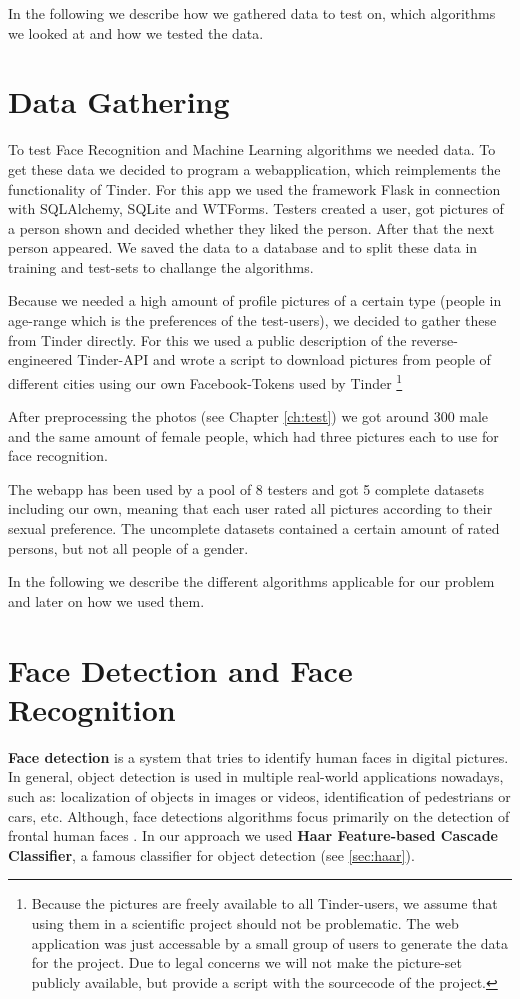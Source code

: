 \documentclass{report}
\begin{document}
In the following we describe how we gathered data to test on, which algorithms we looked at and how we tested the data.

\chapter{Data Gathering}
\label{ch:datagathering}
To test Face Recognition and Machine Learning algorithms we needed data.
To get these data we decided to program a webapplication, which reimplements the functionality of Tinder.
For this app we used the framework Flask\cite{flask} in connection with SQLAlchemy\cite{sqlalchemy}, SQLite\cite{sqlite} and WTForms\cite{wtforms}.
Testers created a user, got pictures of a person shown and decided whether they liked the person.
After that the next person appeared.
We saved the data to a database and to split these data in training and test-sets to challange the algorithms.

Because we needed a high amount of profile pictures of a certain type (people in age-range which is the preferences of the test-users), we decided to gather these from Tinder directly.
For this we used a public description of the reverse-engineered Tinder-API\cite{tinder-api} and wrote a script to download pictures from people of different cities using our own Facebook-Tokens used by Tinder \footnote{
Because the pictures are freely available to all Tinder-users, we assume that using them in a scientific project should not be problematic.
The web application was just accessable by a small group of users to generate the data for the project.
Due to legal concerns we will not make the picture-set publicly available, but provide a script with the sourcecode of the project.}

After preprocessing the photos (see Chapter \ref{ch:test}) we got around 300 male and the same amount of female people, which had three pictures each to use for face recognition.

The webapp has been used by a pool of 8 testers and got 5 complete datasets including our own, meaning that each user rated all pictures according to their sexual preference.
The uncomplete datasets contained a certain amount of rated persons, but not all people of a gender.

In the following we describe the different algorithms applicable for our problem and later on how we used them.

\chapter{Face Detection and Face Recognition}
\textbf{Face detection} is a system that tries to identify human faces in digital pictures. In general, object detection is used in multiple real-world applications nowadays, such as: localization of objects in images or videos, identification of pedestrians or cars, etc. Although, face detections algorithms focus primarily on the detection of frontal human faces \cite{face-detection-wiki}. In our approach we used \textbf{Haar Feature-based Cascade Classifier}, a famous classifier for object detection (see \ref{sec:haar}).
\end{document}
